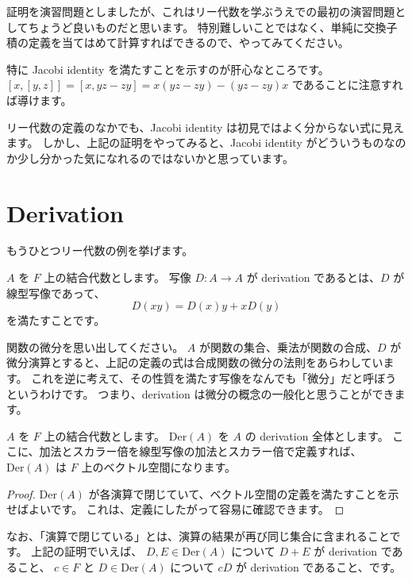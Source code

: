 \documentclass{ltjsarticle}
\begin{document}
証明を演習問題としましたが、これはリー代数を学ぶうえでの最初の演習問題としてちょうど良いものだと思います。
特別難しいことではなく、単純に交換子積の定義を当てはめて計算すればできるので、やってみてください。

特に Jacobi identity を満たすことを示すのが肝心なところです。
$[x, [y, z]] = [x, yz - zy] = x(yz - zy) - (yz - zy)x$ であることに注意すれば導けます。

リー代数の定義のなかでも、Jacobi identity は初見ではよく分からない式に見えます。
しかし、上記の証明をやってみると、Jacobi identity がどういうものなのか少し分かった気になれるのではないかと思っています。

\section{Derivation}

もうひとつリー代数の例を挙げます。

\begin{definition}[derivation]
    $A$ を $F$ 上の結合代数とします。
    写像 $D : A \to A$ が derivation であるとは、$D$ が線型写像であって、
    \[
        D(xy) = D(x)y + xD(y)
    \]
    を満たすことです。
\end{definition}

関数の微分を思い出してください。
$A$ が関数の集合、乗法が関数の合成、$D$ が微分演算とすると、上記の定義の式は合成関数の微分の法則をあらわしています。
これを逆に考えて、その性質を満たす写像をなんでも「微分」だと呼ぼうというわけです。
つまり、derivation は微分の概念の一般化と思うことができます。

\begin{proposition}
    $A$ を $F$ 上の結合代数とします。
    $\mathrm{Der}(A)$ を $A$ の derivation 全体とします。
    ここに、加法とスカラー倍を線型写像の加法とスカラー倍で定義すれば、
    $\mathrm{Der}(A)$ は $F$ 上のベクトル空間になります。
\end{proposition}

\begin{proof}
    $\mathrm{Der}(A)$ が各演算で閉じていて、ベクトル空間の定義を満たすことを示せばよいです。
    これは、定義にしたがって容易に確認できます。
\end{proof}

なお、「演算で閉じている」とは、演算の結果が再び同じ集合に含まれることです。
上記の証明でいえば、
$D, E \in \mathrm{Der}(A)$ について $D + E$ が derivation であること、
$c \in F$ と $D \in \mathrm{Der}(A)$ について $cD$ が derivation であること、です。
\end{document}
